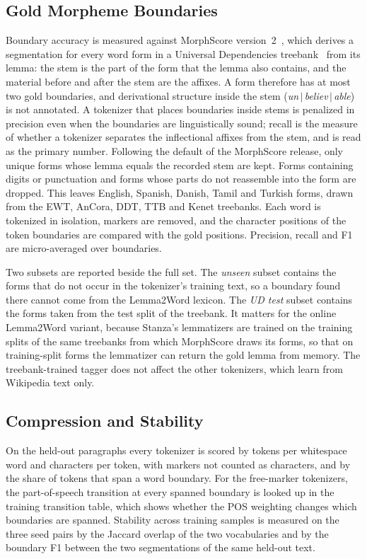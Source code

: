 \subsection{Gold Morpheme Boundaries}\label{sec:gold}
Boundary accuracy is measured against MorphScore version~2~\cite{arnett2025morphscore}, which derives a segmentation for every word form in a Universal Dependencies treebank~\cite{nivre2020ud} from its lemma: the stem is the part of the form that the lemma also contains, and the material before and after the stem are the affixes.
A form therefore has at most two gold boundaries, and derivational structure inside the stem (\emph{un}$\,|\,$\emph{believ}$\,|\,$\emph{able}) is not annotated.
A tokenizer that places boundaries inside stems is penalized in precision even when the boundaries are linguistically sound; recall is the measure of whether a tokenizer separates the inflectional affixes from the stem, and is read as the primary number.
Following the default of the MorphScore release, only unique forms whose lemma equals the recorded stem are kept.
Forms containing digits or punctuation and forms whose parts do not reassemble into the form are dropped.
This leaves \nMorphWordsEnglish{} English, \nMorphWordsSpanish{} Spanish, \nMorphWordsDanish{} Danish, \nMorphWordsTamil{} Tamil and \nMorphWordsTurkish{} Turkish forms, drawn from the EWT, AnCora, DDT, TTB and Kenet treebanks.
Each word is tokenized in isolation, markers are removed, and the character positions of the token boundaries are compared with the gold positions.
Precision, recall and F1 are micro-averaged over boundaries.

Two subsets are reported beside the full set.
The \emph{unseen} subset contains the forms that do not occur in the tokenizer's training text, so a boundary found there cannot come from the Lemma2Word lexicon.
The \emph{UD test} subset contains the forms taken from the test split of the treebank.
It matters for the online Lemma2Word variant, because Stanza's lemmatizers are trained on the training splits of the same treebanks from which MorphScore draws its forms, so that on training-split forms the lemmatizer can return the gold lemma from memory.
The treebank-trained tagger does not affect the other tokenizers, which learn from Wikipedia text only.

\subsection{Compression and Stability}
On the held-out paragraphs every tokenizer is scored by tokens per whitespace word and characters per token, with markers not counted as characters, and by the share of tokens that span a word boundary.
For the free-marker tokenizers, the part-of-speech transition at every spanned boundary is looked up in the training transition table, which shows whether the POS weighting changes which boundaries are spanned.
Stability across training samples is measured on the three seed pairs by the Jaccard overlap of the two vocabularies and by the boundary F1 between the two segmentations of the same held-out text.

